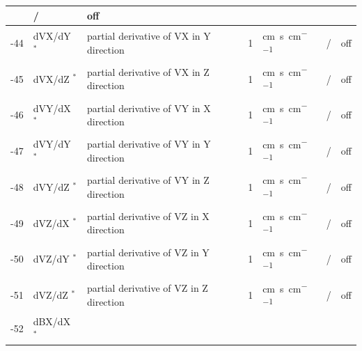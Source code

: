 \begin{landscape}
\begin{longtable}{|r|l|l|l|l|c|c|}
			   & /              & off         
    \\ \hline
    -44                    & dVX/dY $^*$
                           & partial derivative of VX in Y direction  
                           & 1                            & \si{\centi\metre\per\second\per\centi\metre}
			   & /              & off         
    \\ \hline
    -45                    & dVX/dZ $^*$
                           & partial derivative of VX in Z direction  
                           & 1                            & \si{\centi\metre\per\second\per\centi\metre}
			   & /              & off         
    \\ \hline
    -46                    & dVY/dX $^*$
                           & partial derivative of VY in X direction  
                           & 1                            & \si{\centi\metre\per\second\per\centi\metre}
			   & /              & off         
    \\ \hline
    -47                    & dVY/dY $^*$
                           & partial derivative of VY in Y direction  
                           & 1                            & \si{\centi\metre\per\second\per\centi\metre}
			   & /              & off         
    \\ \hline
    -48                    & dVY/dZ $^*$
                           & partial derivative of VY in Z direction  
                           & 1                            & \si{\centi\metre\per\second\per\centi\metre}
			   & /              & off         
    \\ \hline
    -49                    & dVZ/dX $^*$
                           & partial derivative of VZ in X direction  
                           & 1                            & \si{\centi\metre\per\second\per\centi\metre}
			   & /              & off         
    \\ \hline
    -50                    & dVZ/dY $^*$
                           & partial derivative of VZ in Y direction  
                           & 1                            & \si{\centi\metre\per\second\per\centi\metre}
			   & /              & off         
    \\ \hline
    -51                    & dVZ/dZ $^*$
                           & partial derivative of VZ in Z direction  
                           & 1                            & \si{\centi\metre\per\second\per\centi\metre}
			   & /              & off         
    \\ \hline
    -52                    & dBX/dX $^*$

\end{longtable}
\end{landscape}
